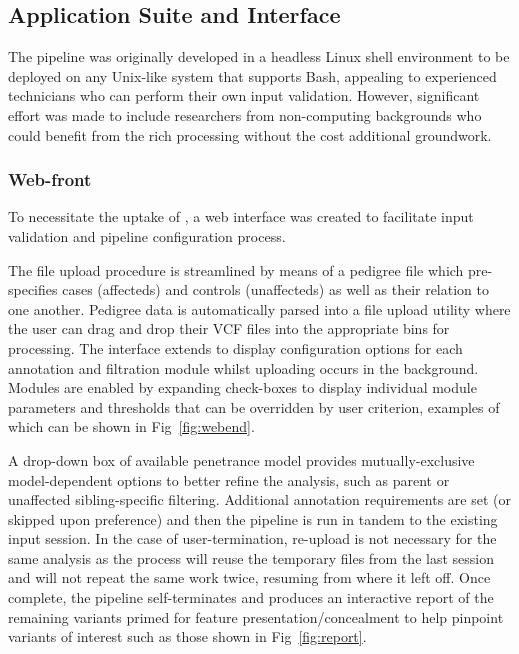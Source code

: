  
\subsection{Application Suite and Interface}

The pipeline was originally developed in a headless Linux shell environment to be deployed on any Unix-like system that supports Bash, appealing to experienced technicians who can perform their own input validation. However, significant effort was made to include researchers from non-computing backgrounds who could benefit from the rich processing without the cost additional groundwork.


\subsubsection{Web-front}

To necessitate the uptake of \app, a web interface was created to facilitate input validation and pipeline configuration process.

The file upload procedure is streamlined by means of a pedigree file which pre-specifies cases (affecteds) and controls (unaffecteds) as well as their relation to one another. Pedigree data is automatically parsed into a file upload utility where the user can drag and drop their VCF files into the appropriate bins for processing. The interface extends to display configuration options for each annotation and filtration module whilst uploading occurs in the background. Modules are enabled by expanding check-boxes to display individual module parameters and thresholds that can be overridden by user criterion, examples of which can be shown in Fig~\ref{fig:webend}. 

A drop-down box of available penetrance model provides mutually-exclusive model-dependent options to better refine the analysis, such as parent or unaffected sibling-specific filtering. Additional annotation requirements are set (or skipped upon preference) and then the pipeline is run in tandem to the existing input session. In the case of user-termination, re-upload is not necessary for the same analysis as the process will reuse the temporary files from the last session and will not repeat the same work twice, resuming from where it left off. Once complete, the pipeline self-terminates and produces an interactive report of the remaining variants primed for feature presentation/concealment to help pinpoint variants of interest such as those shown in Fig~\ref{fig:report}.

